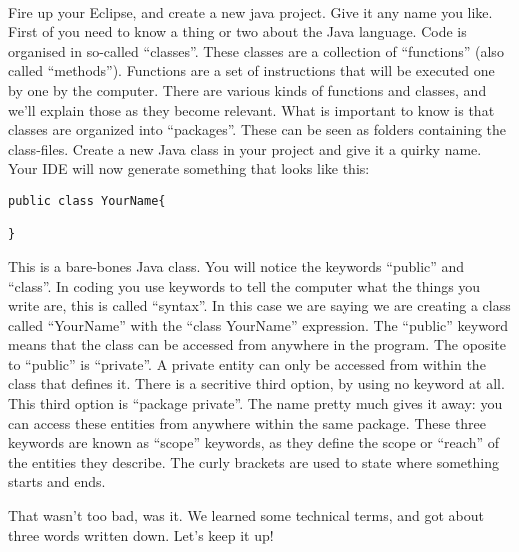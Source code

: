 \documentclass[11pt,fleqn]{book} %
\begin{document}
\paragraph{} Fire up your Eclipse, and create a new java project. Give it any name you like. First of you need to know a thing or two about the Java language.
Code is organised in so-called ``classes''. These classes are a collection of ``functions'' (also called ``methods''). Functions are a set of instructions that will be executed one by one by the computer. There are various kinds of functions and classes, and we'll explain those as they become relevant. What is important to know is that classes are organized into ``packages''. These can be seen as folders containing the class-files.
Create a new Java class in your project and give it a quirky name. Your IDE will now generate something that looks like this:

\begin{lstlisting}
public class YourName{
	
}
\end{lstlisting}

This is a bare-bones Java class. You will notice the keywords ``public'' and ``class''. In coding you use keywords to tell the computer what the things you write are, this is called ``syntax''.
In this case we are saying we are creating a class called ``YourName'' with the ``class YourName'' expression. The ``public'' keyword means that the class can be accessed from anywhere in the program. The oposite to ``public'' is ``private''. A private entity can only be accessed from within the class that defines it. There is a secritive third option, by using no keyword at all. This third option is ``package private''. The name pretty much gives it away: you can access these entities from anywhere within the same package. These three keywords are known as ``scope'' keywords, as they define the scope or ``reach'' of the entities they describe.
The curly brackets are used to state where something starts and ends. 

\begin{remark}
	That wasn't too bad, was it. We learned some technical terms, and got about three words written down. Let's keep it up!
\end{remark}
\end{document}
